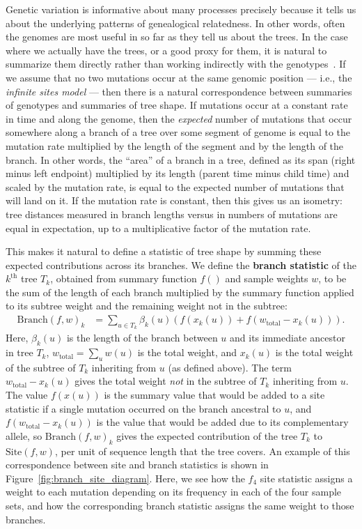 \documentclass[9pt,twoside,lineno]{gsajnl}
\newcommand{\branch}{\mbox{Branch}} %
\newcommand{\site}{\mbox{Site}} %
\newcommand{\iw}{w} %
\newcommand{\tiw}{w_\text{total}} %
\newcommand{\nw}{x} %
\begin{document}
Genetic variation is informative about many processes
precisely because it tells us about the underlying patterns of genealogical relatedness.
In other words, often the genomes are most useful in so far as they tell us about the trees.
In the case where we actually have the trees, or a good proxy for them,
it is natural to summarize them directly rather than working indirectly with the
genotypes~\citep{harris2019database}.
If we assume that no two mutations occur at the same genomic position ---
i.e., the \emph{infinite sites model} ---
then there is a natural correspondence between summaries of genotypes and summaries of tree shape.
If mutations occur at a constant rate in time and along the genome,
then the \emph{expected} number of mutations that occur somewhere along a branch of a tree
over some segment of genome
is equal to the mutation rate multiplied by the length of the segment and by the length of the branch.
In other words, the ``area'' of a branch in a tree,
defined as its span (right minus left endpoint) multiplied by its length (parent time minus child time)
and scaled by the mutation rate,
is equal to the expected number of mutations that will land on it.
If the mutation rate is constant,
then this gives us an isometry:
tree distances measured in branch lengths versus in numbers of mutations
are equal in expectation, up to a multiplicative factor of the mutation rate.

This makes it natural to define
a statistic of tree shape by summing these expected contributions across its branches.
We define the \textbf{branch statistic} of the $k^\text{th}$ tree $T_k$,
obtained from summary function $f()$ and sample weights $\iw$,
to be the sum of the length of each branch
multiplied by the summary function applied to its subtree weight
and the remaining weight not in the subtree:
\begin{align}\label{eqn:branch_stat_tree}
    \branch(f, \iw)_k
    &=
    \sum_{u \in T_k} \beta_{k}(u) \left( f(\nw_{k}(u)) + f(\tiw - \nw_{k}(u)) \right)  .
\end{align}
Here, $\beta_{k}(u)$ is the length of the branch between $u$ and its immediate ancestor in tree $T_k$,
$\tiw = \sum_u \iw(u)$ is the total weight,
and $\nw_{k}(u)$ is the total weight of the subtree of $T_k$ inheriting from $u$ (as defined above).
The term $\tiw - \nw_{k}(u)$ gives the total weight \emph{not} in the subtree of $T_k$ inheriting from $u$.
The value $f(\nw(u))$ is the summary value that would be added to a site statistic
if a single mutation occurred on the branch ancestral to $u$,
and $f(\tiw - \nw_{k}(u))$ is the value that would be added due to its complementary allele,
so $\branch(f, \iw)_k$ gives the expected contribution of the tree $T_k$ to $\site(f, \iw)$,
per unit of sequence length that the tree covers.
An example of this correspondence between site and branch statistics
is shown in Figure~\ref{fig:branch_site_diagram}. Here, we
see how the $f_4$ site statistic assigns a weight to each mutation
depending on its frequency in each of the four sample sets,
and how the corresponding branch statistic assigns the same weight to those branches.
\end{document}
